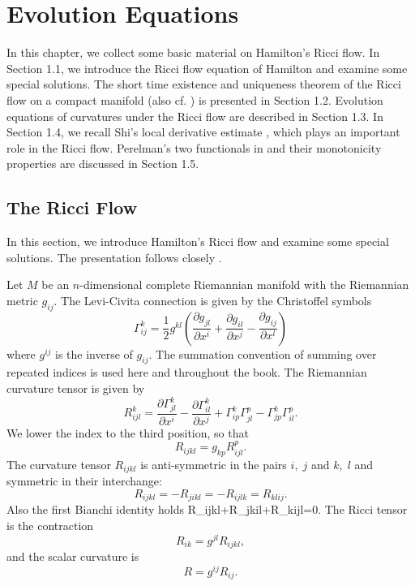 \chapter{Evolution Equations}
\label{chap:cz-evolution-equations}



In this chapter, we collect some basic material on Hamilton's
Ricci flow. In Section 1.1, we introduce the Ricci flow equation
of Hamilton \cite{Ha82} and examine some special solutions. The
short time existence and uniqueness theorem of the Ricci flow on a
compact manifold \cite{Ha82} (also cf. \cite{De}) is presented in
Section 1.2. Evolution equations of curvatures under the Ricci
flow \cite{Ha82, Ha86} are described in Section 1.3. In Section
1.4, we recall Shi's local derivative estimate \cite{Sh89}, which
plays an important role in the Ricci flow. Perelman's two
functionals in \cite{P1} and their monotonicity properties are
discussed in Section 1.5.



\section{The Ricci Flow}

In this section, we introduce Hamilton's Ricci flow and examine
some special solutions. The presentation follows closely
\cite{Ha82, Ha95F}.

Let $M$ be an $n$-dimensional complete Riemannian manifold with
the Riemannian metric $g_{ij}$.  The Levi-Civita connection is
given by the Christoffel symbols
$$
\Gamma^k_{ij}=\frac{1}{2}g^{kl}\left( \frac{\partial
g_{jl}}{\partial x^i}+\frac{\partial g_{il}}{\partial
x^j}-\frac{\partial g_{ij}}{\partial x^l}\right)
$$
where $g^{ij}$ is the inverse of $g_{ij}$. The summation
convention of summing over repeated indices is used here and
throughout the book. The Riemannian curvature tensor is given by
$$
R^k_{ijl}=\frac{\partial \Gamma^k_{jl}}{\partial x^i}
-\frac{\partial \Gamma^k_{il}}{\partial
x^j}+\Gamma^k_{ip}\Gamma^p_{jl}-\Gamma^k_{jp}\Gamma^p_{il}.
$$
We lower the index to the third position, so that
$$
R_{ijkl}=g_{kp}R^p_{ijl}.
$$
The curvature tensor $R_{ijkl}$ is anti-symmetric in the pairs
$i,\; j$ and $k,\; l$ and symmetric in their interchange:
$$
R_{ijkl}=-R_{jikl}=-R_{ijlk}=R_{klij}.
$$
Also the first Bianchi identity holds \be
R_{ijkl}+R_{jkil}+R_{kijl}=0.              %
\ee The Ricci tensor is the contraction
$$
R_{ik}=g^{jl}R_{ijkl},
$$
and the scalar curvature is
$$
R=g^{ij}R_{ij}.
$$

